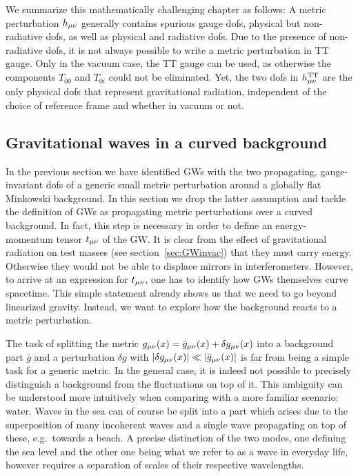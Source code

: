 We summarize this mathematically challenging chapter as follows: A metric perturbation $h_{{\mu \nu}}$ generally contains spurious gauge \acp{dof}, physical but non-radiative \acp{dof}, as well as physical and radiative \acp{dof}. Due to the presence of non-radiative \acp{dof},   it is not always possible to write a metric perturbation in \ac{TT} gauge. Only in the vacuum case, the \ac{TT} gauge can be used, as otherwise the components $T_{00}$ and $T_{0i}$ could not be eliminated. Yet, the two \acp{dof} in $h_{{\mu \nu}}^{\text{TT}}$ are the only physical \acp{dof} that represent gravitational radiation, independent of the choice of reference frame and whether in vacuum or not.

\subsection{Gravitational waves in a curved background}  \label{sec:GWcurvedbackground}

In the previous section we have identified \acp{GW} with the two propagating, gauge-invariant \acp{dof} of a generic small metric perturbation around a globally flat Minkowski background. In this section we drop the latter assumption and tackle the definition of \acp{GW} as propagating metric perturbations over a curved background. In fact, this step is necessary in order to define an energy-momentum tensor $t_{{\mu \nu}}$ of the \ac{GW}. It is clear from the effect of  gravitational radiation on test masses (see section~\ref{sec:GWinvac}) that they must carry energy.  Otherwise they would not be able to displace mirrors in interferometers. However, to arrive at an expression for $t_{{\mu \nu}}$, one has to identify how \acp{GW} themselves curve spacetime. This simple statement already shows us that we need to go beyond linearized gravity. Instead, we want to explore how the background reacts to a metric perturbation.

The task of splitting the metric $g_{{\mu \nu}}(x) = \bar{g}_{{\mu \nu}}(x) + \delta g_{{\mu \nu}}(x)$ into a background part $\bar{g}$ and a perturbation $\delta g$ with $\lvert\delta g_{{\mu \nu}}(x)\rvert \ll \lvert\bar{g}_{{\mu \nu}}(x)\rvert $ is far from being a simple task for a generic metric. In the general case, it is indeed not possible to precisely distinguish a background from the fluctuations on top of it. This ambiguity can be understood more  intuitively when comparing with a more familiar scenario: water. Waves in the sea can of course be split into a part which arises due to the superposition of many incoherent waves and a single wave propagating on top of these, e.g.~towards a beach. A precise distinction of the two modes, one defining the sea level and the other one being what we refer to as a wave in everyday life, however requires a separation of scales of their respective wavelengths.

